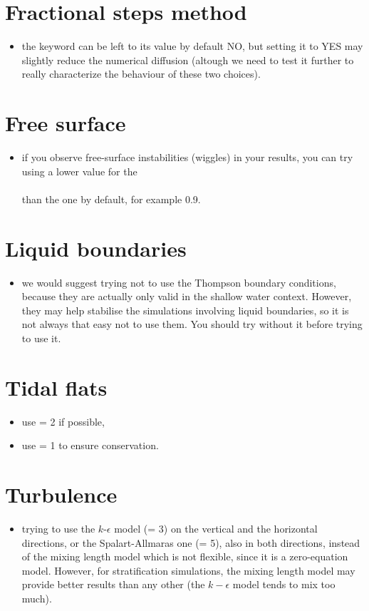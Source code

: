 \section{Fractional steps method}
\begin{itemize}
\item the keyword  can be left to its value by default NO,
but setting it to YES may slightly reduce the numerical diffusion
(altough we need to test it further to really characterize the behaviour of these two choices).
\end{itemize}

\section{Free surface}
\begin{itemize}
\item if you observe free-surface instabilities (wiggles) in your results,
you can try using a lower value for the\\
\\
than the one by default, for example 0.9.
\end{itemize}

\section{Liquid boundaries}
\begin{itemize}
\item we would suggest trying not to use the Thompson boundary conditions,
because they are actually only valid in the shallow water context.
However, they may help stabilise the simulations involving liquid boundaries,
so it is not always that easy not to use them.
You should try without it before trying to use it.
\end{itemize}

\section{Tidal flats}
\begin{itemize}
\item use  = 2 if possible,
\item use  = 1 to ensure conservation.
\end{itemize}

\section{Turbulence}
\begin{itemize}
\item trying to use the $k$-$\epsilon$ model (= 3) on the vertical and the horizontal directions,
or the Spalart-Allmaras one (= 5), also in both directions,
instead of the mixing length model which is not flexible, since it is a zero-equation model.
However, for stratification simulations, the mixing length model
may provide better results than any other (the $k-\epsilon$ model tends to mix too much).
\end{itemize}


